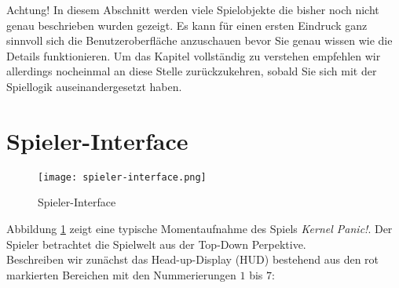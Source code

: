 Achtung! In diesem Abschnitt werden viele Spielobjekte die bisher noch nicht genau beschrieben wurden gezeigt. Es kann für einen ersten Eindruck ganz sinnvoll sich die Benutzeroberfläche anzuschauen bevor Sie genau wissen wie die Details funktionieren. Um das Kapitel vollständig zu verstehen empfehlen wir allerdings nocheinmal an diese Stelle zurückzukehren, sobald Sie sich mit der Spiellogik auseinandergesetzt haben.
\section{Spieler-Interface}
%
%
%
%
%
%
%
%
\begin{figure}[ht]
	\centering
	\texttt{[image: spieler-interface.png]}
	\caption{Spieler-Interface}
	\label{fig:spieler-interface}
\end{figure} \newpage
Abbildung \ref{fig:spieler-interface} zeigt eine typische Momentaufnahme des Spiels \textit{Kernel Panic!}.
Der Spieler betrachtet die Spielwelt aus der Top-Down Perpektive.\\
Beschreiben wir zunächst das Head-up-Display (HUD) bestehend aus den rot markierten Bereichen mit den Nummerierungen $1$ bis $7$:
